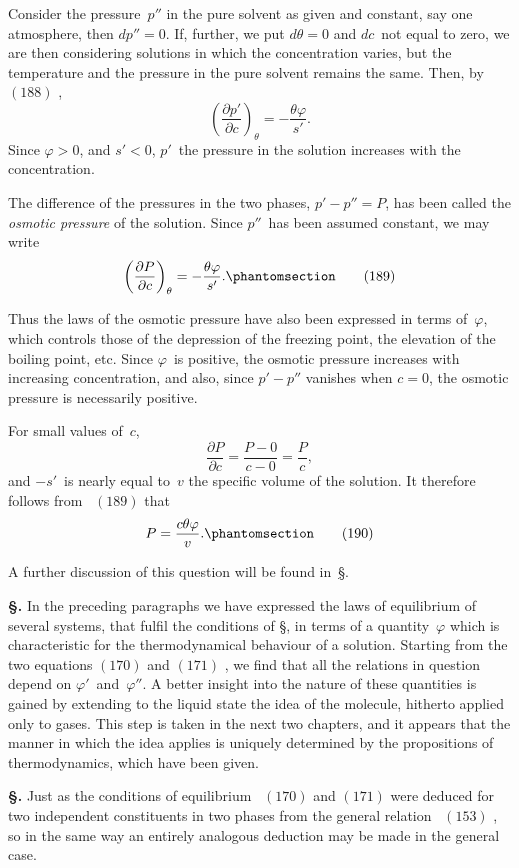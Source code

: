 \documentclass[12pt]{book}[2005/09/16]
\newcommand{\Section}[1]{
  \medskip\par\textbf{§\;#1}
  \label{section:#1}
}
\newcommand{\SecRef}[2][§\;]{\hyperref[section:#2.]{{\upshape #1#2}}}
\newcommand{\Tag}[1]{%
  \phantomsection\label{eqn:#1}\tag*{\ensuremath{#1}}%
}
\newcommand{\Eq}[1]{%
  \hyperref[eqn:#1]{\ensuremath{#1}}%
}
\newcommand{\PageSep}[1]{\ignorespaces}
\newcommand{\dd}{\partial}
\begin{document}
Consider the pressure~$p''$ in the pure solvent as given and
%
constant, say one atmosphere, then $dp'' = 0$. If, further, we
put $d\theta = 0$ and $dc$~not equal to zero, we are then considering
solutions in which the concentration varies, but the temperature
and the pressure in the pure solvent remains the
same. Then, by~\Eq{(188)},
\[
\left(\frac{\dd p'}{\dd c}\right)_{\theta} = -\frac{\theta\varphi}{s'}.
\]
Since $\varphi > 0$, and $s' < 0$, $p'$~the pressure in the solution
increases with the concentration.

The difference of the pressures in the two phases,
$p' - p'' = P$, has been called the \emph{osmotic pressure} of the
%
solution. Since $p''$~has been assumed constant, we may write
\[
\left(\frac{\dd P}{\dd c}\right)_{\theta} = -\frac{\theta\varphi}{s'}.
\Tag{(189)}
\]
\PageSep{205}

Thus the laws of the osmotic pressure have also been
expressed in terms of~$\varphi$, which controls those of the depression
of the freezing point, the elevation of the boiling point, etc.
Since $\varphi$~is positive, the osmotic pressure increases with increasing
concentration, and also, since $p' - p''$ vanishes when
$c = 0$, the osmotic pressure is necessarily positive.

For small values of~$c$,
\[
\frac{\dd P}{\dd c} = \frac{P - 0}{c - 0} = \frac{P}{c},
\]
and $-s'$~is nearly equal to~$v$ the specific volume of the
solution. It therefore follows from~\Eq{(189)} that
\[
P = \frac{c\theta\varphi}{v}.
\Tag{(190)}
\]

A further discussion of this question will be found in~\SecRef{272}.

\Section{230.} In the preceding paragraphs we have expressed
the laws of equilibrium of several systems, that fulfil the
conditions of \SecRef{220}, in terms of a quantity~$\varphi$ which is characteristic
for the thermodynamical behaviour of a solution.
Starting from the two equations \Eq{(170)} and \Eq{(171)}, we find
that all the relations in question depend on $\varphi'$~and~$\varphi''$. A
better insight into the nature of these quantities is gained
by extending to the liquid state the idea of the molecule,
hitherto applied only to gases. This step is taken in
the next two chapters, and it appears that the manner in
which the idea applies is uniquely determined by the
propositions of thermodynamics, which have been given.

\Section{231.} Just as the conditions of equilibrium~\Eq{(170)} and
\Eq{(171)} were deduced for two independent constituents in two
phases from the general relation~\Eq{(153)}, so in the same
way an entirely analogous deduction may be made in the
general case.
\end{document}
